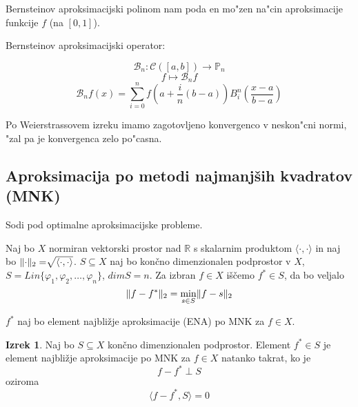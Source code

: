 \documentclass[a4paper,12pt]{article}
\DeclarePairedDelimiter\norm{\lVert}{\rVert}
\newcommand{\innerproduct}[2]{\langle #1, #2 \rangle}
\theoremstyle{definition}
\newtheorem{theorem}[counter]{Izrek}
\theoremstyle{remark}
\newcommand{\R}{\mathbb{R}}
\newcommand{\Pp}{\mathbb{P}}
\begin{document}
Bernsteinov aproksimacijski polinom nam poda en mo"zen na"cin aproksimacije funkcije $f$ (na $[0, 1]$).

Bernsteinov aproksimacijski operator:

\begin{equation*}
    \mathscr{B}_n : \mathscr{C} ([a, b]) \to \Pp_n
\end{equation*}
\begin{equation*}
    f \mapsto \mathscr{B}_n f
\end{equation*}
\begin{equation*}
    \mathscr{B}_n f(x) = \sum_{i = 0}^{n} f(a + \frac{i}{n}(b-a)) B_i^n (\frac{x-a}{b-a})
\end{equation*}

Po Weierstrassovem izreku imamo zagotovljeno konvergenco v neskon"cni normi, "zal pa je konvergenca zelo po"casna.



\subsection{Aproksimacija po metodi najmanjših kvadratov \- (MNK)}
Sodi pod optimalne aproksimacijske probleme.

Naj bo $X$ normiran vektorski prostor nad $\R$ s skalarnim produktom $\innerproduct{\cdot}{\cdot}$ in naj bo $\norm{\cdot}_2 = \sqrt[]{\innerproduct{\cdot}{\cdot}}$.
$S \subseteq X$ naj bo končno dimenzionalen podprostor v $X$, $S = Lin\{\varphi_1, \varphi_2, \dots, \varphi_n\}$, $dimS = n$. Za izbran $f \in X$ iščemo $f^* \in S$, da bo veljalo
\begin{equation*}
    \norm{f - f^*}_2 = \min_{s\in S} \norm{f - s}_2
\end{equation*}

$f^*$ naj bo element najbližje aproksimacije (ENA) po MNK za $f \in X$.

\begin{theorem}
    Naj bo $S \subseteq X$ končno dimenzionalen podprostor. Element $f^* \in S$ je element najbližje aproksimacije po MNK za $f \in X$ natanko takrat,
    ko je
    \begin{equation*}
        f - f^* \perp S
    \end{equation*}
    oziroma
    \begin{equation*}
        \innerproduct{f - f^*}{S} = 0
    \end{equation*}
\end{theorem}
\end{document}
